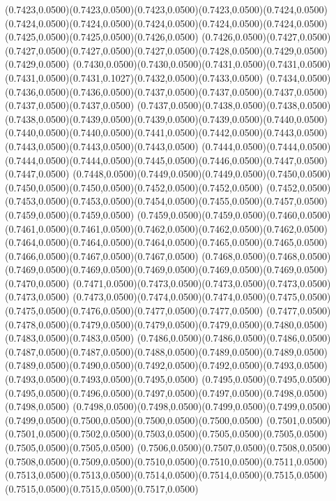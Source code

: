 (0.7423,0.0500)(0.7423,0.0500)(0.7423,0.0500)(0.7423,0.0500)(0.7424,0.0500)
\PST@Solid(0.7424,0.0500)(0.7424,0.0500)(0.7424,0.0500)(0.7424,0.0500)(0.7424,0.0500)(0.7425,0.0500)(0.7425,0.0500)(0.7426,0.0500)
(0.7426,0.0500)(0.7427,0.0500)(0.7427,0.0500)(0.7427,0.0500)(0.7427,0.0500)(0.7428,0.0500)(0.7429,0.0500)(0.7429,0.0500)
(0.7430,0.0500)(0.7430,0.0500)(0.7431,0.0500)(0.7431,0.0500)(0.7431,0.0500)(0.7431,0.1027)(0.7432,0.0500)(0.7433,0.0500)
(0.7434,0.0500)(0.7436,0.0500)(0.7436,0.0500)(0.7437,0.0500)(0.7437,0.0500)(0.7437,0.0500)(0.7437,0.0500)(0.7437,0.0500)
(0.7437,0.0500)(0.7438,0.0500)(0.7438,0.0500)(0.7438,0.0500)(0.7439,0.0500)(0.7439,0.0500)(0.7439,0.0500)(0.7440,0.0500)
(0.7440,0.0500)(0.7440,0.0500)(0.7441,0.0500)(0.7442,0.0500)(0.7443,0.0500)(0.7443,0.0500)(0.7443,0.0500)(0.7443,0.0500)
(0.7444,0.0500)(0.7444,0.0500)(0.7444,0.0500)(0.7444,0.0500)(0.7445,0.0500)(0.7446,0.0500)(0.7447,0.0500)(0.7447,0.0500)
(0.7448,0.0500)(0.7449,0.0500)(0.7449,0.0500)(0.7450,0.0500)(0.7450,0.0500)(0.7450,0.0500)(0.7452,0.0500)(0.7452,0.0500)
(0.7452,0.0500)(0.7453,0.0500)(0.7453,0.0500)(0.7454,0.0500)(0.7455,0.0500)(0.7457,0.0500)(0.7459,0.0500)(0.7459,0.0500)
(0.7459,0.0500)(0.7459,0.0500)(0.7460,0.0500)(0.7461,0.0500)(0.7461,0.0500)(0.7462,0.0500)(0.7462,0.0500)(0.7462,0.0500)
(0.7464,0.0500)(0.7464,0.0500)(0.7464,0.0500)(0.7465,0.0500)(0.7465,0.0500)(0.7466,0.0500)(0.7467,0.0500)(0.7467,0.0500)
(0.7468,0.0500)(0.7468,0.0500)(0.7469,0.0500)(0.7469,0.0500)(0.7469,0.0500)(0.7469,0.0500)(0.7469,0.0500)(0.7470,0.0500)
(0.7471,0.0500)(0.7473,0.0500)(0.7473,0.0500)(0.7473,0.0500)(0.7473,0.0500)
\PST@Solid(0.7473,0.0500)(0.7474,0.0500)(0.7474,0.0500)(0.7475,0.0500)(0.7475,0.0500)(0.7476,0.0500)(0.7477,0.0500)(0.7477,0.0500)
(0.7477,0.0500)(0.7478,0.0500)(0.7479,0.0500)(0.7479,0.0500)(0.7479,0.0500)(0.7480,0.0500)(0.7483,0.0500)(0.7483,0.0500)
(0.7486,0.0500)(0.7486,0.0500)(0.7486,0.0500)(0.7487,0.0500)(0.7487,0.0500)(0.7488,0.0500)(0.7489,0.0500)(0.7489,0.0500)
(0.7489,0.0500)(0.7490,0.0500)(0.7492,0.0500)(0.7492,0.0500)(0.7493,0.0500)(0.7493,0.0500)(0.7493,0.0500)(0.7495,0.0500)
(0.7495,0.0500)(0.7495,0.0500)(0.7495,0.0500)(0.7496,0.0500)(0.7497,0.0500)(0.7497,0.0500)(0.7498,0.0500)(0.7498,0.0500)
(0.7498,0.0500)(0.7498,0.0500)(0.7499,0.0500)(0.7499,0.0500)(0.7499,0.0500)(0.7500,0.0500)(0.7500,0.0500)(0.7500,0.0500)
(0.7501,0.0500)(0.7501,0.0500)(0.7502,0.0500)(0.7503,0.0500)(0.7505,0.0500)(0.7505,0.0500)(0.7505,0.0500)(0.7505,0.0500)
(0.7506,0.0500)(0.7507,0.0500)(0.7508,0.0500)(0.7508,0.0500)(0.7509,0.0500)(0.7510,0.0500)(0.7510,0.0500)(0.7511,0.0500)
(0.7513,0.0500)(0.7513,0.0500)(0.7514,0.0500)(0.7514,0.0500)(0.7515,0.0500)(0.7515,0.0500)(0.7515,0.0500)(0.7517,0.0500)
